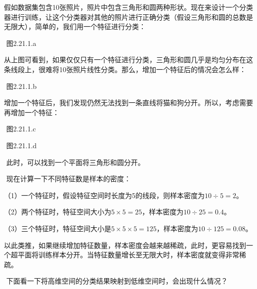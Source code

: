 ​
假如数据集包含10张照片，照片中包含三角形和圆两种形状。现在来设计一个分类器进行训练，让这个分类器对其他的照片进行正确分类（假设三角形和圆的总数是无限大），简单的，我们用一个特征进行分类：

 

​ 图2.21.1.a

​
从上图可看到，如果仅仅只有一个特征进行分类，三角形和圆几乎是均匀分布在这条线段上，很难将10张照片线性分类。那么，增加一个特征后的情况会怎么样：

 

​ 图2.21.1.b

增加一个特征后，我们发现仍然无法找到一条直线将猫和狗分开。所以，考虑需要再增加一个特征：

 

​ 图2.21.1.c

 

​ 图2.21.1.d

​ 此时，可以找到一个平面将三角形和圆分开。

​ 现在计算一下不同特征数是样本的密度：

​
（1）一个特征时，假设特征空间时长度为5的线段，则样本密度为$10 \div 5 = 2$。

​ （2）两个特征时，特征空间大小为$ 5\times5 =
25$，样本密度为$10 \div 25 = 0.4$。

​ （3）三个特征时，特征空间大小是$ 5\times5\times5 =
125$，样本密度为$10 \div 125 = 0.08$。

​
以此类推，如果继续增加特征数量，样本密度会越来越稀疏，此时，更容易找到一个超平面将训练样本分开。当特征数量增长至无限大时，样本密度就变得非常稀疏。

​ 下面看一下将高维空间的分类结果映射到低维空间时，会出现什么情况？

